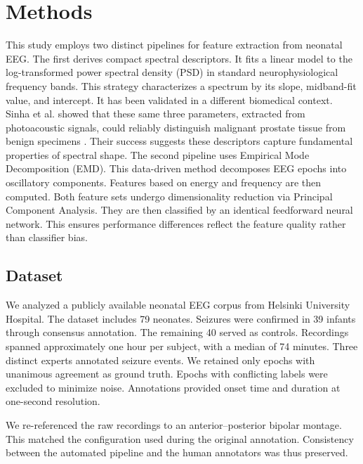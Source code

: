 \documentclass[pdflatex,sn-mathphys-num]{sn-jnl}%
\theoremstyle{thmstyleone}%
\theoremstyle{thmstyletwo}%
\theoremstyle{thmstylethree}%
\begin{document}

\section{Methods}\label{sec11}

This study employs two distinct pipelines for feature extraction from neonatal EEG. The first derives compact spectral descriptors. It fits a linear model to the log-transformed power spectral density (PSD) in standard neurophysiological frequency bands. This strategy characterizes a spectrum by its slope, midband-fit value, and intercept. It has been validated in a different biomedical context. Sinha et al. showed that these same three parameters, extracted from photoacoustic signals, could reliably distinguish malignant prostate tissue from benign specimens \cite{sinha2016}. Their success suggests these descriptors capture fundamental properties of spectral shape. The second pipeline uses Empirical Mode Decomposition (EMD). This data-driven method decomposes EEG epochs into oscillatory components. Features based on energy and frequency are then computed. Both feature sets undergo dimensionality reduction via Principal Component Analysis. They are then classified by an identical feedforward neural network. This ensures performance differences reflect the feature quality rather than classifier bias.

\subsection{Dataset}\label{subsec:dataset}

We analyzed a publicly available neonatal EEG corpus from Helsinki University Hospital. The dataset includes 79 neonates. Seizures were confirmed in 39 infants through consensus annotation. The remaining 40 served as controls. Recordings spanned approximately one hour per subject, with a median of 74 minutes. Three distinct experts annotated seizure events. We retained only epochs with unanimous agreement as ground truth. Epochs with conflicting labels were excluded to minimize noise. Annotations provided onset time and duration at one-second resolution.

We re-referenced the raw recordings to an anterior--posterior bipolar montage. This matched the configuration used during the original annotation. Consistency between the automated pipeline and the human annotators was thus preserved.
\end{document}
